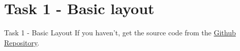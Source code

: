 \section{Task 1 - Basic layout}

\begin{frame}{Task 1 - Basic Layout}
    If you haven't, get the source code from the \href{https://github.com/NEEECFEUP/WS-App-Development/}{Github Repository}.
\end{frame}